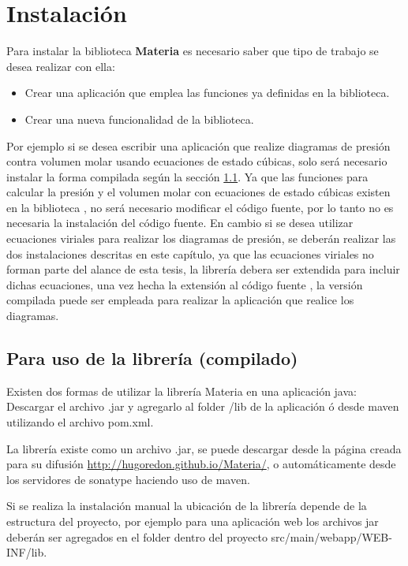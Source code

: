 \chapter{Instalación}

  Para instalar la biblioteca \textbf{Materia} es necesario saber que tipo de trabajo se desea realizar con ella:
  \begin{itemize}
    \item Crear una aplicación que emplea las funciones ya definidas en la biblioteca.
    \item Crear una nueva funcionalidad de la biblioteca.
  \end{itemize}

  Por ejemplo si se desea escribir una aplicación que realize diagramas de presión contra volumen molar usando ecuaciones de estado cúbicas, solo será necesario instalar la forma compilada según la sección \ref{sec:compiledinstall}. Ya que las funciones para calcular la presión y el volumen molar con ecuaciones de estado cúbicas existen en la biblioteca , no será necesario modificar el código fuente, por lo tanto no es necesaria la instalación del código fuente. En cambio si se desea utilizar ecuaciones viriales para realizar los diagramas de presión, se deberán realizar las dos instalaciones descritas en este capítulo, ya que las ecuaciones viriales no forman parte del alance de esta tesis, la librería debera ser extendida para incluir dichas ecuaciones, una vez hecha la extensión al código fuente , la versión compilada puede ser empleada para realizar la aplicación que realice los diagramas.


  \section{Para uso de la librería (compilado)}\label{sec:compiledinstall}

      Existen dos formas de utilizar la librería Materia en una aplicación java:
    Descargar el archivo .jar y agregarlo al folder /lib de la aplicación ó desde maven utilizando el archivo pom.xml.

    La librería existe como un archivo .jar, se puede descargar desde la página creada para su difusión \url{http://hugoredon.github.io/Materia/}, o automáticamente desde los servidores de sonatype haciendo uso de maven.

    Si se realiza la instalación manual la ubicación de la librería depende de la estructura del proyecto, por ejemplo para una aplicación web los archivos jar deberán ser agregados en el folder dentro del proyecto src/main/webapp/WEB-INF/lib.

